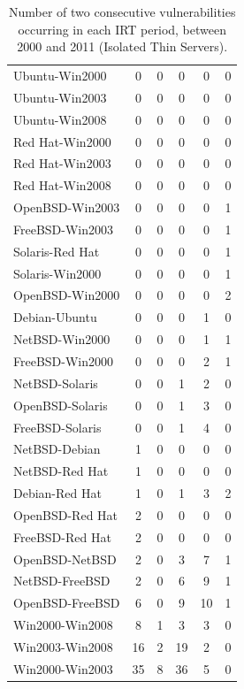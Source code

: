 \begin{table}[!ht]
\begin{center}
{\begin{tabular}{|l||c c c c c|}
Ubuntu-Win2000 & 0 & 0 & 0 & 0 & 0 \\
Ubuntu-Win2003 & 0 & 0 & 0 & 0 & 0 \\
Ubuntu-Win2008 & 0 & 0 & 0 & 0 & 0 \\
Red Hat-Win2000 & 0 & 0 & 0 & 0 & 0 \\
Red Hat-Win2003 & 0 & 0 & 0 & 0 & 0  \\
Red Hat-Win2008 & 0 & 0 & 0 & 0 & 0 \\ \hline
OpenBSD-Win2003 & 0 & 0 & 0 & 0 & 1 \\
FreeBSD-Win2003 & 0 & 0 & 0 & 0 & 1 \\
Solaris-Red Hat & 0 & 0 & 0 & 0 & 1 \\
Solaris-Win2000 & 0 & 0 & 0 & 0 & 1  \\
OpenBSD-Win2000 & 0 & 0 & 0 & 0 & 2 \\ \hline
Debian-Ubuntu & 0 & 0 & 0 & 1 & 0 \\
NetBSD-Win2000 & 0 & 0 & 0 & 1 & 1 \\
FreeBSD-Win2000 & 0 & 0 & 0 & 2 & 1 \\ \hline
NetBSD-Solaris & 0 & 0 & 1 & 2 & 0 \\
OpenBSD-Solaris & 0 & 0 & 1 & 3 & 0 \\
FreeBSD-Solaris & 0 & 0 & 1 & 4 & 0 \\ \hline
NetBSD-Debian & 1 & 0 & 0 & 0 & 0  \\
NetBSD-Red Hat & 1 & 0 & 0 & 0 & 0 \\
Debian-Red Hat & 1 & 0 & 1 & 3 & 2 \\
OpenBSD-Red Hat & 2 & 0 & 0 & 0 & 0 \\
FreeBSD-Red Hat & 2 & 0 & 0 & 0 & 0 \\
OpenBSD-NetBSD & 2 & 0 & 3 & 7 & 1 \\
NetBSD-FreeBSD & 2 & 0 & 6 & 9 & 1 \\
OpenBSD-FreeBSD & 6 & 0 & 9 & 10 &  1\\
Win2000-Win2008 & 8 & 1 & 3 & 3 & 0 \\
Win2003-Win2008 & 16 & 2 & 19 & 2 & 0 \\
Win2000-Win2003 & 35 & 8 & 36 & 5 & 0\\ \hline
\end{tabular}
\caption{Number of two consecutive vulnerabilities occurring in each IRT period, between 2000 and 2011 (Isolated Thin Servers).}
\label{tab:pairs_irt_iso}
}
\end{center}
\end{table}

